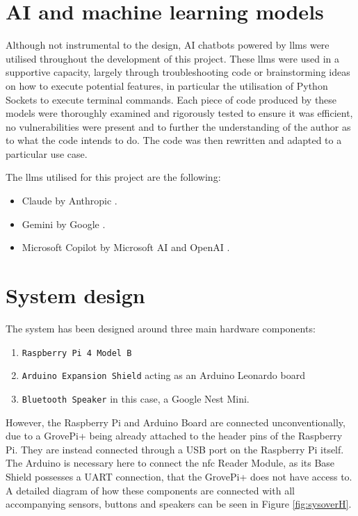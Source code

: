 \section{AI and machine learning models}\label{sec:aiml}
Although not instrumental to the design, AI chatbots powered by \gls{llm}s were utilised throughout the development of this project. These \gls{llm}s were used in a supportive capacity, largely through troubleshooting code or brainstorming ideas on how to execute potential features, in particular the utilisation of Python Sockets to execute terminal commands. Each piece of code produced by these models were thoroughly examined and rigorously tested to ensure it was efficient, no vulnerabilities were present and to further the understanding of the author as to what the code intends to do. The code was then rewritten and adapted to a particular use case.

The \gls{llm}s utilised for this project are the following:
\begin{itemize}
    \item Claude by Anthropic \citep{Anthropic2026}.
    \item Gemini by Google \citep{GoogleAI2026}.
    \item Microsoft Copilot by Microsoft AI and OpenAI \citep{MicrosoftAI2026}.
\end{itemize}

\section{System design}\label{sec:design}
The system has been designed around three main hardware components:
\begin{enumerate}
    \item \texttt{Raspberry Pi 4 Model B}
    \item \texttt{Arduino Expansion Shield} acting as an Arduino Leonardo board
    \item \texttt{Bluetooth Speaker} in this case, a Google Nest Mini.
\end{enumerate}
However, the Raspberry Pi and Arduino Board are connected unconventionally, due to a GrovePi+ being already attached to the header pins of the Raspberry Pi. They are instead connected through a USB port on the Raspberry Pi itself. The Arduino is necessary here to connect the \gls{nfc} Reader Module, as its Base Shield possesses a UART connection, that the GrovePi+ does not have access to. A detailed diagram of how these components are connected with all accompanying sensors, buttons and speakers can be seen in Figure \ref{fig:sysoverH}.

